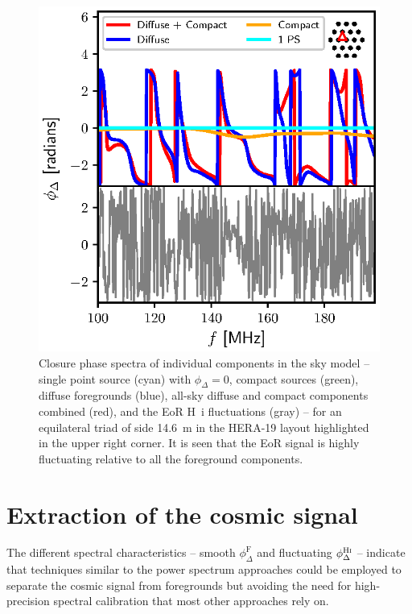 \documentclass[
reprint,
superscriptaddress,
amsmath,
amssymb,
aps,
prd
]{revtex4-1}
\begin{document}
\begin{figure}[htb]
\includegraphics[width=0.85\linewidth]{closure_phase_spectra_1_15_16}
\caption{Closure phase spectra of individual components in the sky model -- single point source (cyan) with $\phi_\Delta=0$, compact sources (green), diffuse foregrounds (blue), all-sky diffuse and compact components combined (red), and the EoR H~{\sc i} fluctuations (gray) -- for an equilateral triad of side 14.6~m in the HERA-19 layout highlighted in the upper right corner. It is seen that the EoR signal is highly fluctuating relative to all the foreground components. \label{fig:cp-spectra}}
\end{figure}

\section{Extraction of the cosmic signal}\label{sec:extraction}

The different spectral characteristics -- smooth $\phi_\Delta^\textrm{F}$ and fluctuating $\phi_\Delta^\textrm{H{\sc i}}$ -- indicate that techniques similar to the power spectrum approaches could be employed to separate the cosmic signal from foregrounds but avoiding the need for high-precision spectral calibration that most other approaches rely on.
\end{document}
